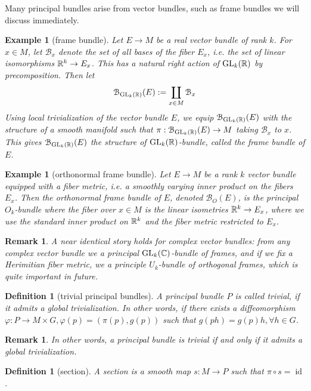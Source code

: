 \documentclass[11pt]{amsart}
\numberwithin{equation}{section}
\theoremstyle{plain}
\theoremstyle{plain}
\newtheorem{defnsub}[thmsub]{Definition}
\newtheorem{remksub}[thmsub]{Remark}
\newtheorem{exsub}[thmsub]{Example}
\numberwithin{equation}{section}
\begin{document}
Many principal bundles arise from vector bundles, such as frame bundles we will discuss immediately.
\begin{exsub}[frame bundle]\normalfont
Let $E\to M$ be a real vector bundle of rank $k$. For $x\in M$, let $\mathcal{B}_x$ denote the set of all bases of the fiber $E_x$, i.e. the set of linear isomorphisms $\Bbb{R}^k\to E_x$. This has a natural right action of $\operatorname{GL}_k(\Bbb{R})$ by precomposition. Then let
$$
\mathcal{B}_{\operatorname{GL}_k(\Bbb{R})}(E):=\coprod_{x\in M}\mathcal{B}_x
$$
Using local trivialization of the vector bundle $E$, we equip $\mathcal{B}_{\operatorname{GL}_k(\Bbb{R})}(E)$ with the structure of a smooth manifold such that $\pi:\mathcal{B}_{\operatorname{GL}_k(\Bbb{R})}(E)\to M$ taking $\mathcal{B}_x$ to $x$. This gives $\mathcal{B}_{\operatorname{GL}_k(\Bbb{R})}(E)$ the structure of $\operatorname{GL}_k(\Bbb{R})$-bundle, called the frame bundle of $E$.
\end{exsub}
\begin{exsub}[orthonormal frame bundle]\normalfont
Let $E\to M$ be a rank $k$ vector bundle equipped with a fiber metric, i.e. a smoothly varying inner product on the fibers $E_x$. Then the orthonormal frame bundle of $E$, denoted $\mathcal{B}_O(E)$, is the principal $O_k$-bundle where the fiber over $x\in M$ is the linear isometries $\Bbb{R}^k\to E_x$, where we use the standard inner product on $\Bbb{R}^k$ and the fiber metric restricted to $E_x$.
\end{exsub}
\begin{remksub}\normalfont
A near identical story holds for complex vector bundles: from any complex vector bundle we a principal $\operatorname{GL}_k(\Bbb{C})$-bundle of frames, and if we fix a Herimitian fiber metric, we a principle $U_k$-bundle of orthogonal frames, which is quite important in future.
\end{remksub}
\begin{defnsub}[trivial principal bundles]
A principal bundle $P$ is called trivial, if it admits a global trivialization. In other words, if there exists a diffeomorphism $\varphi:P\to M\times G, \varphi(p)=(\pi(p),g(p))$ such that $g(ph)=g(p)h,\forall h\in G$.
\end{defnsub}
\begin{remksub}\normalfont
In other words, a principal bundle is trivial if and only if it admits a global trivialization.
\end{remksub}
\begin{defnsub}[section]
A section is a smooth map $s:M\to P$ such that $\pi\circ s=\operatorname{id}$.
\end{defnsub}
\end{document}
